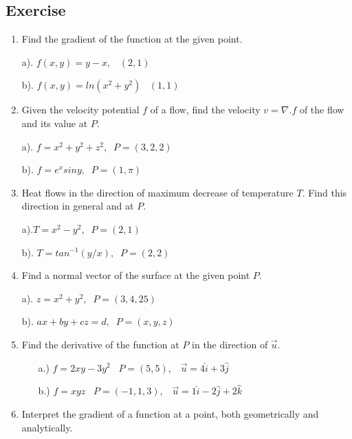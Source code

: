 \documentclass[aima331_lecturenotes_ku.tex]{subfiles}
\begin{document}
\subsection{Exercise}
\begin{enumerate}
\item Find the gradient of the function at the given point.
  \begin{multicols}{2}
    a). \(\displaystyle f(x,y)=y-x, \;\;\; (2,1)\)
    \columnbreak

    b). \(\displaystyle f(x,y)=ln(x^2+y^2) \;\;\; (1,1)\)
  \end{multicols}

\item Given the velocity potential $f$ of a flow, find the velocity $v=\nabla. f$ of the flow and its value at $P$.
  \begin{multicols}{2}
    a). $f=x^2+y^2+z^2, \;\; P=(3,2,2)$
    \columnbreak

    b). $f=e^xsiny, \;\; P=(1, \pi)$
  \end{multicols}

\item Heat flows in the direction of maximum decrease of temperature $T$. Find this direction in general and at $P$.
  \begin{multicols}{2}
    a).$T=x^2-y^2, \;\; P=(2,1)$
    \columnbreak

    b). $T=tan^{-1}(y/x), \;\; P=(2,2)$
  \end{multicols}

\item Find a normal vector of the surface at the given point $P$.
  \begin{multicols}{2}
    a). $z=x^2+y^2,\;\; P=(3,4,25)$
    \columnbreak

    b). $ax+by+cz=d, \;\; P=(x,y,z)$
  \end{multicols}

\item Find the derivative of the function at \(P\) in the direction of \(\vec{u}\).
  \begin{enumerate}
  \item[a.)] \(\displaystyle f=2xy-3y^2 \;\;\; P=(5,5), \;\;\; \vec{u}=4\hat{i} + 3\hat{j}\)
  \item[b.)] \(\displaystyle f=xyz \;\;\; P=(-1,1,3), \;\;\; \vec{u}=1\hat{i} -2\hat{j}+2\hat{k}\)
  \end{enumerate}
  \item Interpret the gradient of a function at a point, both geometrically and analytically.
  \end{enumerate}
\end{document}
